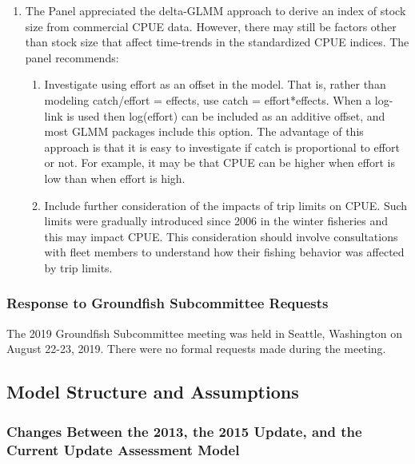 \documentclass[12pt,]{article}
\begin{document}
\begin{enumerate}
\item The Panel appreciated the delta-GLMM approach to derive an index of stock size from commercial CPUE data. However, there may still be factors other than stock size that affect time-trends in the standardized CPUE indices. The panel recommends:
\begin{enumerate}

\item Investigate using effort as an offset in the model. That is, rather than modeling catch/effort = effects, use catch = effort*effects. When a log-link is used then
log(effort) can be included as an additive offset, and most GLMM packages include this option. The advantage of this approach is that it is easy to investigate if catch is proportional to effort or not. For example, it may be that CPUE can be higher when effort is low than when effort is high.

\item Include further consideration of the impacts of trip limits on CPUE. Such limits were gradually introduced since 2006 in the winter fisheries and this may impact CPUE. This consideration should involve consultations with fleet members to understand how their fishing behavior was affected by trip limits.

\end{enumerate}

\end{enumerate}

\subsubsection{Response to Groundfish Subcommittee
Requests}\label{response-to-groundfish-subcommittee-requests}

The 2019 Groundfish Subcommittee meeting was held in Seattle, Washington
on August 22-23, 2019. There were no formal requests made during the
meeting.

\subsection{Model Structure and
Assumptions}\label{model-structure-and-assumptions}

\subsubsection{Changes Between the 2013, the 2015 Update, and the
Current Update Assessment
Model}\label{changes-between-the-2013-the-2015-update-and-the-current-update-assessment-model}
\end{document}
